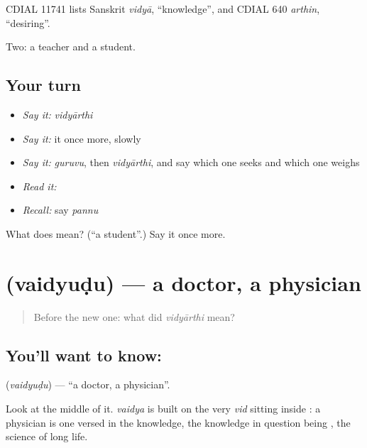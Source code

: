 CDIAL 11741 lists Sanskrit \emph{vidyā}, \textquotedblleft{}knowledge\textquotedblright{}, and CDIAL 640 \emph{arthin}, \textquotedblleft{}desiring\textquotedblright{}.

\begin{grammarlens}[title={What you've built}]
Two: a teacher and a student.
\end{grammarlens}

\subsection*{Your turn}
\begin{itemize}
\raggedright
  \item \emph{Say it:} \emph{vidyārthi}
  \item \emph{Say it:} it once more, slowly
  \item \emph{Say it:} \emph{guruvu}, then \emph{vidyārthi}, and say which one seeks and which one weighs
  \item \emph{Read it:} \textbf{}
  \item \emph{Recall:} say \emph{pannu}
\end{itemize}

\begin{tcolorbox}[breakable,colback=teal!4,colframe=teal!35!black,title={Before you move on}]
What does  mean? (\textquotedblleft{}a student\textquotedblright{}.) Say it once more.
\end{tcolorbox}
\section[\texorpdfstring{\te{వైద్యుడు} (vaidyuḍu)}{వైద్యుడు (vaidyuḍu)}]{ (vaidyuḍu) — a doctor, a physician}

\label{lesson:TE-C48-doctor}



\begin{quote}
Before the new one: what did \emph{vidyārthi} mean?
\end{quote}

\subsection*{You'll want to know: }
\textbf{} (\emph{vaidyuḍu}) — \textquotedblleft{}a doctor, a physician\textquotedblright{}.

Look at the middle of it. \emph{vaidya} is built on the very \emph{vid} sitting inside : a physician is one versed in the knowledge, the knowledge in question being , the science of long life.

